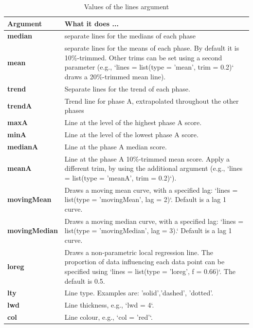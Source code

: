 \documentclass[
]{book}
\begin{document}
\begin{table}

\caption{\label{tab:table-lines-arguments}Values of the lines argument}
\begin{tabular}[t]{>{\raggedright\arraybackslash}p{15em}>{\raggedright\arraybackslash}p{30em}}
\toprule
Argument & What it does ...\\
\midrule
\textbf{median} & separate lines for the medians of each phase\\
\textbf{mean} & separate lines for the means of each phase. By default it is 10\%-trimmed. Other trims can be set using a second parameter (e.g., `lines = list(type = 'mean', trim = 0.2)` draws a 20\%-trimmed mean line).\\
\textbf{trend} & Separate lines for the trend of each phase.\\
\textbf{trendA} & Trend line for phase A, extrapolated throughout the other phases\\
\textbf{maxA} & Line at the level of the highest phase A score.\\
\textbf{minA} & Line at the level of the lowest phase A score.\\
\textbf{medianA} & Line at the phase A median score.\\
\textbf{meanA} & Line at the phase A 10\%-trimmed mean score. Apply a different trim, by using the additional argument (e.g., `lines = list(type = 'meanA', trim = 0.2)`).\\
\textbf{movingMean} & Draws a moving mean curve, with a specified lag: `lines = list(type = 'movingMean', lag = 2)`. Default is a lag 1 curve.\\
\textbf{movingMedian} & Draws a moving median curve, with a specified lag: `lines = list(type = 'movingMedian', lag = 3).` Default is a lag 1 curve.\\
\textbf{loreg} & Draws a non-parametric local regression line. The proportion of data influencing each data point can be specified using `lines = list(type = 'loreg', f = 0.66)`. The default is 0.5.\\
\textbf{lty} & Line type. Examples are: 'solid','dashed', 'dotted'.\\
\textbf{lwd} & Line thickness, e.g., `lwd = 4`.\\
\textbf{col} & Line colour, e.g., `col = 'red'`.\\
\bottomrule
\end{tabular}
\end{table}
\end{document}
